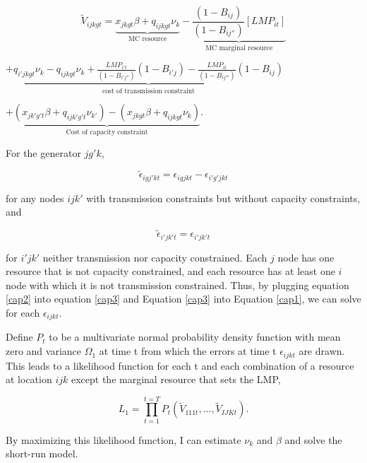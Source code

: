 \documentclass[12pt]{article}
\begin{document}
\begin{equation}\label{mlequation}
\tilde{V}_{ijkgt}=\underbrace{x_{jkgt}\beta+q_{ijkgt}\nu_k}_\text{MC resource}-\underbrace{\frac{(1-B_{ij})}{(1-B_{ij''})}[LMP_{it}]}_\text{MC marginal resource}
\end{equation}
\begin{center}
$+\underbrace{q_{i'jkgt}\nu_k-q_{ijkgt}\nu_k+\frac{LMP_{i't}}{(1-B_{i'j''})}(1-B_{i'j})-
\frac{LMP_{it}}{(1-B_{ij'''})}(1-B_{ij})}_\text{cost of transmission constraint}$

$+\underbrace{(x_{jk'g't}\beta+q_{ijk'g't}\nu_{k'})-(x_{jkgt}\beta+q_{ijkgt}\nu_k)}_\text{Cost of capacity constraint}$.
\end{center}

\noindent For the generator $jg'k$, 

\begin{equation}\label{cap3}
\tilde{\epsilon}_{igj'kt}=\epsilon_{igjkt}-\epsilon_{i'g'jkt}
\end{equation}

\noindent for any nodes $ijk'$ with transmission constraints but without capacity constraints, and 

\begin{equation}\label{cap2}
\tilde{\epsilon}_{i'jk't}=\epsilon_{i'jk't}
\end{equation}

\noindent for $i'jk'$ neither transmission nor capacity constrained. Each $j$ node has one resource that is not capacity constrained, and each resource has at least one $i$ node with which it is not transmission constrained. Thus, by plugging equation \ref{cap2} into equation \ref{cap3} and Equation \ref{cap3} into Equation \ref{cap1}, we can solve for each $\epsilon_{ijkt}.$

Define $P_t$ to be a multivariate normal probability density function with mean zero and variance $\Omega_1$ at time t from which the errors at time t $\epsilon_{ijkt}$ are drawn. This leads to a likelihood function for each t and each combination of a resource at location $ijk$ except the marginal resource that sets the LMP,

\begin{equation}\label{likelihoodFunction}
L_1= \prod_{t=1}^{t=T} P_t(\tilde{V}_{111t},...,\tilde{V}_{IJKt}).
\end{equation}

\noindent By maximizing this likelihood function, I can estimate $\nu_k$ and $\beta$ and solve the short-run model.
\end{document}
